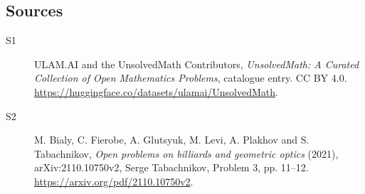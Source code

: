 \documentclass[11pt]{article}
\begin{document}
\subsection{Sources}
\begin{description}
\item[\hypertarget{source:statement:1}{S1}] ULAM.AI and the UnsolvedMath Contributors, \emph{UnsolvedMath: A Curated Collection of Open Mathematics Problems}, catalogue entry. CC BY 4.0. \url{https://huggingface.co/datasets/ulamai/UnsolvedMath}.
\item[\hypertarget{source:statement:2}{S2}] M. Bialy, C. Fierobe, A. Glutsyuk, M. Levi, A. Plakhov and S. Tabachnikov, \emph{Open problems on billiards and geometric optics} (2021), arXiv:2110.10750v2, Serge Tabachnikov, Problem 3, pp. 11--12. \url{https://arxiv.org/pdf/2110.10750v2}.
\end{description}
\label{end:statement}
\end{document}
